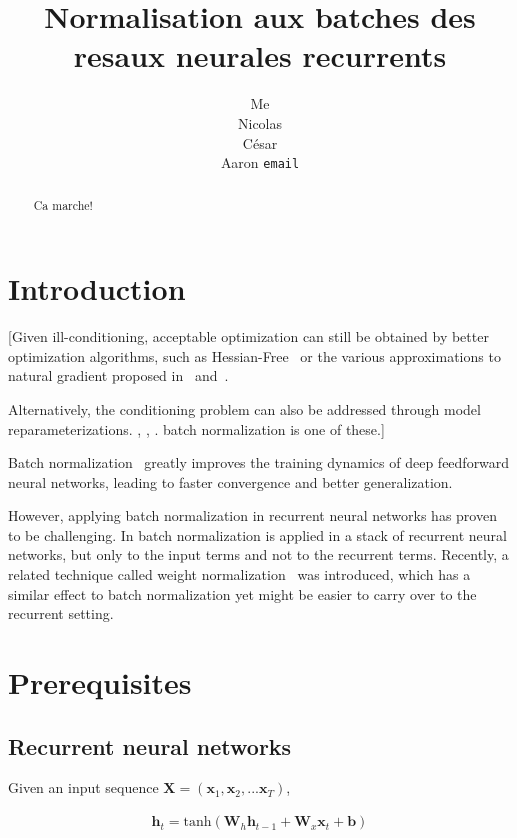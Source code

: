 \documentclass{article} %
\title{Normalisation aux batches des resaux neurales recurrents}
\author{
Me \\
\And
Nicolas \\
\And
C\'esar \\
\And
Aaron
\texttt{email} \\
}
\newcommand{\vect}[1]{\mathbf{#1}}
\newcommand{\mat}[1]{\mathbf{#1}}
\begin{document}
\maketitle

\begin{abstract}
\,Ca marche!
\end{abstract}

\section{Introduction}

[Given ill-conditioning, acceptable optimization can still be obtained by better optimization algorithms, such as
Hessian-Free~\cite{hessianfree} or the various approximations to natural gradient proposed in~\cite{ollivier} and~\cite{KFAC}.

Alternatively, the conditioning problem can also be addressed through model reparameterizations.
\cite{efficientbackprop}, \cite{raiko}, \cite{naturalneuralnetworks}.
batch normalization is one of these.]

Batch normalization~\cite{batchnorm} greatly improves the training dynamics of deep feedforward neural networks, leading to faster convergence and better generalization.

However, applying batch normalization in recurrent neural networks has proven to be challenging.
In \cite{baidu} batch normalization is applied in a stack of recurrent neural networks, but only to the input terms and not to the recurrent terms.
\cite{cesar}
Recently, a related technique called weight normalization~\cite{weightnorm} was introduced, which has a similar effect to batch normalization yet might be easier to carry over to the recurrent setting.

\section{Prerequisites}
\subsection{Recurrent neural networks}

Given an input sequence $\mat{X} = ( \vect{x}_1, \vect{x}_2, ... \vect{x}_T )$,

\begin{align}
\vect{h}_t = \mathrm{tanh}(
  \mat{W}_h \vect{h}_{t-1} +
  \mat{W}_x \vect{x}_t +
  \vect{b})
\end{align}
\end{document}
